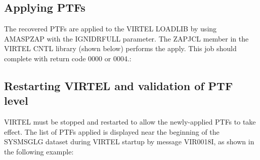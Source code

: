 \documentclass[letterpaper,10pt,english]{sphinxmanual}
\begin{document}
\subsection{Applying PTFs}
\label{\detokenize{Installation_Guide:applying-ptfs}}
The recovered PTFs are applied to the VIRTEL LOADLIB by using AMASPZAP with the IGNIDRFULL parameter. The ZAPJCL member in the VIRTEL CNTL library (shown below) performs the apply. This job should complete with return code 0000 or 0004.:

\begin{sphinxVerbatim}[commandchars=\\\{\}]
  
   
  
  
  
  
  
  
  
\end{sphinxVerbatim}



\subsection{Restarting VIRTEL and validation of PTF level}
\label{\detokenize{Installation_Guide:restarting-virtel-and-validation-of-ptf-level}}
VIRTEL must be stopped and restarted to allow the newly-applied PTFs to take effect. The list of PTFs applied is displayed near the beginning of the SYSMSGLG dataset during VIRTEL startup by message VIR0018I, as shown in the following example:
\end{document}
